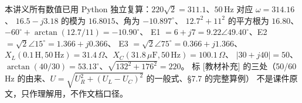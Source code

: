 \documentclass[11pt]{ctexart}
\begin{document}
\flowerrule

{\small\color{inkgray}
本讲义所有数值已用 Python 独立复算：$220\sqrt2=311.1$、$50\,\mathrm{Hz}$ 对应 $\omega=314.16$、
$16.5-j3.18$ 的模为 $16.8015$、角为 $-10.897^\circ$、
$12.7^2+11^2$ 的平方根为 $16.80$、$-60^\circ+\arctan(12.7/11)=-10.90^\circ$、
E1 $=6+j7=9.22\angle49.40^\circ$、E2 $=\sqrt2\angle15^\circ=1.366+j0.366$、
E3 $=\sqrt2\angle75^\circ=0.366+j1.366$、
$X_L(0.1\,\mathrm{H},50\,\mathrm{Hz})=31.4\,\Omega$、$X_C(31.8\,\mu\mathrm{F},50\,\mathrm{Hz})=100.1\,\Omega$、
$|30+j40|=50$、$\arctan(40/30)=53.13^\circ$、$\sqrt{132^2+176^2}=220$。
标 [教材补充] 的三处（50/60 Hz 的由来、$U=\sqrt{U_R^2+(U_L-U_C)^2}$ 的一般式、§7.7 的完整算例）
不是课件原文，只作理解用，不作文档口径。}
\end{document}
